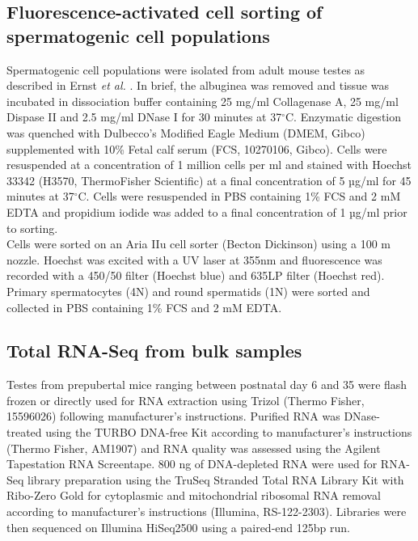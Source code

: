 \subsection{Fluorescence-activated cell sorting of spermatogenic cell populations}
\label{appA.2.sorting}

Spermatogenic cell populations were isolated from adult mouse testes as described in Ernst \emph{et al.} \citep{Ernst2016}. In brief, the albuginea was removed and tissue was incubated in dissociation buffer containing 25 mg/ml Collagenase A, 25 mg/ml Dispase II and 2.5 mg/ml DNase I for 30 minutes at 37$^\circ$C. Enzymatic digestion was quenched with Dulbecco’s Modified Eagle Medium (DMEM, Gibco) supplemented with 10\% Fetal calf serum (FCS, 10270106, Gibco). Cells were resuspended at a concentration of 1 million cells per ml and stained with Hoechst 33342 (H3570, ThermoFisher Scientific) at a final concentration of 5 µg/ml for 45 minutes at 37$^\circ$C. Cells were resuspended in PBS containing 1\% FCS and 2 mM EDTA and propidium iodide was added to a final concentration of 1 µg/ml prior to sorting. \\
Cells were sorted on an Aria IIu cell sorter (Becton Dickinson) using a 100 \textmu{}m nozzle. Hoechst was excited with a UV laser at 355nm and fluorescence was recorded with a 450/50 filter (Hoechst blue) and 635LP filter (Hoechst red). Primary spermatocytes (4N) and round spermatids (1N) were sorted and collected in PBS containing 1\% FCS and 2 mM EDTA. 

\subsection{Total RNA-Seq from bulk samples}
\label{appA.2.bulk}

Testes from prepubertal mice ranging between postnatal day 6 and 35 were flash frozen or directly used for RNA extraction using Trizol (Thermo Fisher, 15596026) following manufacturer’s instructions. Purified RNA was DNase-treated using the TURBO DNA-free Kit according to manufacturer’s instructions (Thermo Fisher, AM1907) and RNA quality was assessed using the Agilent Tapestation RNA Screentape. 800 ng of DNA-depleted RNA were used for RNA-Seq library preparation using the TruSeq Stranded Total RNA Library Kit with Ribo-Zero Gold for cytoplasmic and mitochondrial ribosomal RNA removal according to manufacturer’s instructions (Illumina, RS-122-2303). Libraries were then sequenced on Illumina HiSeq2500 using a paired-end 125bp run. 

